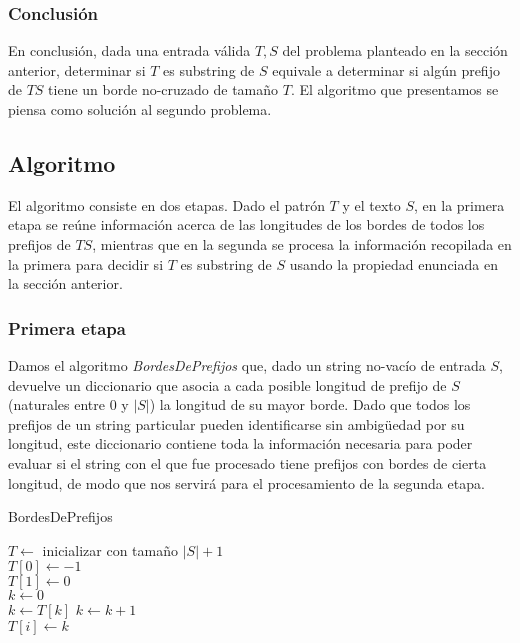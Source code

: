 \subsubsection{Conclusión}

En conclusión, dada una entrada válida $T, S$ del problema planteado en la sección anterior, determinar si $T$ es substring de $S$ equivale a determinar si algún prefijo de $TS$ tiene un borde no-cruzado de tamaño $T$. El algoritmo que presentamos se piensa como solución al segundo problema.

\subsection{Algoritmo}

El algoritmo consiste en dos etapas. Dado el patrón $T$ y el texto $S$, en la primera etapa se reúne información acerca de las longitudes de los bordes de todos los prefijos de $TS$, mientras que en la segunda se procesa la información recopilada en la primera para decidir si $T$ es substring de $S$ usando la propiedad enunciada en la sección anterior.

\subsubsection{Primera etapa}

Damos el algoritmo \textit{BordesDePrefijos} que, dado un string no-vacío de entrada $S$, devuelve un diccionario que asocia a cada posible longitud de prefijo de $S$ (naturales entre 0 y $|S|$) la longitud de su mayor borde. Dado que todos los prefijos de un string particular pueden identificarse sin ambigüedad por su longitud, este diccionario contiene toda la información necesaria para poder evaluar si el string con el que fue procesado tiene prefijos con bordes de cierta longitud, de modo que nos servirá para el procesamiento de la segunda etapa.

\bigskip

\begin{algorithm}[H]
	\caption{BordesDePrefijos}

	$T \gets$ inicializar con tamaño $|S|+1$ \\
	$T [0] \gets -1$ \\
	$T [1] \gets 0$ \\
	$k \gets 0$ \\
	
     {
	 {
		$k \gets T[k]$
    	}
	$k \gets k+1$ \\
	$T[i] \gets k$
}

\end{algorithm}


